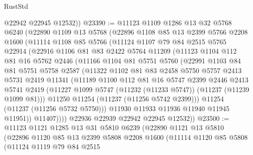 \begin{lexlean}{RustStd}
\begin{coremodule}
        @22942
        @22945
        @12532))
@23390 := @11123
    @1109
    @1286
    @13
    @32
    @5768
    @6240
    (@22890
      @1109
      @13
      @5768
      (@22896
        @1108
        @85
        @13
        @2399
        @5766
        @2208
        @1600
        (@11114
          @1108
          @85
          @5766
          (@11124
            @1107
            @79
            @84
            @2515
            @5765
            @22914
            (@22916
              @1106
              @81
              @83
              @2422
              @5764
              @11209
              (@11123
                @1104
                @112
                @81
                @16
                @5762
                @2446
                (@11166
                  @1104
                  @81
                  @5751
                  @5760
                  (@22991
                    @1103
                    @84
                    @81
                    @5751
                    @5758
                    @2587
                    (@11322
                      @1102
                      @81
                      @83
                      @2458
                      @5750
                      @5757
                      @2413
                      @5731
                      @2419
                      @11341
                      (@11189
                        @1100
                        @112
                        @81
                        @16
                        @5747
                        @2399
                        @2446
                        @2413
                        @5741
                        @2419
                        (@11227 @1099 @5747 (@11232 (@11233 @5747)) (@11237 (@11239 @1099 @81)))
                        @11250
                        @11254
                        (@11237 (@11256 @5742 @2399)))
                      @11254
                      (@11237 (@11256 @5732 @5750)))
                    @11930
                    @11933
                    @11936
                    @11940
                    @11945
                    @11951))
                @11407))))
        @22936
        @22939
        @22942
        @22945
        @12532))
@23500 := @11123
    @1121
    @1285
    @13
    @31
    @5810
    @6239
    (@22890
      @1121
      @13
      @5810
      (@22896
        @1120
        @85
        @13
        @2399
        @5808
        @2208
        @1600
        (@11114
          @1120
          @85
          @5808
          (@11124
            @1119
            @79
            @84
            @2515

\end{coremodule}
\end{lexlean}
